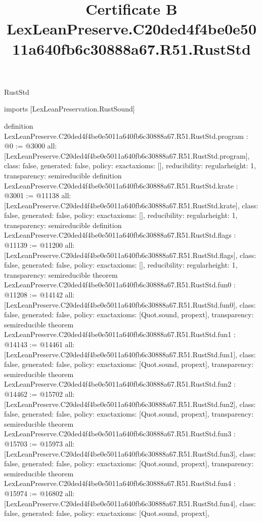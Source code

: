 \begin{lexlean}{RustStd}
\title{Certificate B LexLeanPreserve.C20ded4f4be0e5011a640fb6c30888a67.R51.RustStd}
\begin{coremodule}
imports [LexLeanPreservation.RustSound]

definition LexLeanPreserve.C20ded4f4be0e5011a640fb6c30888a67.R51.RustStd.program : @0 := @3000 {
  all: [LexLeanPreserve.C20ded4f4be0e5011a640fb6c30888a67.R51.RustStd.program],
  class: false,
  generated: false,
  policy: exact{axioms: []},
  reducibility: regular{height: 1},
  transparency: semireducible
}
definition LexLeanPreserve.C20ded4f4be0e5011a640fb6c30888a67.R51.RustStd.krate : @3001 := @11138 {
  all: [LexLeanPreserve.C20ded4f4be0e5011a640fb6c30888a67.R51.RustStd.krate],
  class: false,
  generated: false,
  policy: exact{axioms: []},
  reducibility: regular{height: 1},
  transparency: semireducible
}
definition LexLeanPreserve.C20ded4f4be0e5011a640fb6c30888a67.R51.RustStd.flags : @11139 := @11200 {
  all: [LexLeanPreserve.C20ded4f4be0e5011a640fb6c30888a67.R51.RustStd.flags],
  class: false,
  generated: false,
  policy: exact{axioms: []},
  reducibility: regular{height: 1},
  transparency: semireducible
}
theorem LexLeanPreserve.C20ded4f4be0e5011a640fb6c30888a67.R51.RustStd.fun0 : @11208 := @14142 {
  all: [LexLeanPreserve.C20ded4f4be0e5011a640fb6c30888a67.R51.RustStd.fun0],
  class: false,
  generated: false,
  policy: exact{axioms: [Quot.sound, propext]},
  transparency: semireducible
}
theorem LexLeanPreserve.C20ded4f4be0e5011a640fb6c30888a67.R51.RustStd.fun1 : @14143 := @14461 {
  all: [LexLeanPreserve.C20ded4f4be0e5011a640fb6c30888a67.R51.RustStd.fun1],
  class: false,
  generated: false,
  policy: exact{axioms: [Quot.sound, propext]},
  transparency: semireducible
}
theorem LexLeanPreserve.C20ded4f4be0e5011a640fb6c30888a67.R51.RustStd.fun2 : @14462 := @15702 {
  all: [LexLeanPreserve.C20ded4f4be0e5011a640fb6c30888a67.R51.RustStd.fun2],
  class: false,
  generated: false,
  policy: exact{axioms: [Quot.sound, propext]},
  transparency: semireducible
}
theorem LexLeanPreserve.C20ded4f4be0e5011a640fb6c30888a67.R51.RustStd.fun3 : @15703 := @15973 {
  all: [LexLeanPreserve.C20ded4f4be0e5011a640fb6c30888a67.R51.RustStd.fun3],
  class: false,
  generated: false,
  policy: exact{axioms: [Quot.sound, propext]},
  transparency: semireducible
}
theorem LexLeanPreserve.C20ded4f4be0e5011a640fb6c30888a67.R51.RustStd.fun4 : @15974 := @16802 {
  all: [LexLeanPreserve.C20ded4f4be0e5011a640fb6c30888a67.R51.RustStd.fun4],
  class: false,
  generated: false,
  policy: exact{axioms: [Quot.sound, propext]},
}
\end{coremodule}
\end{lexlean}
